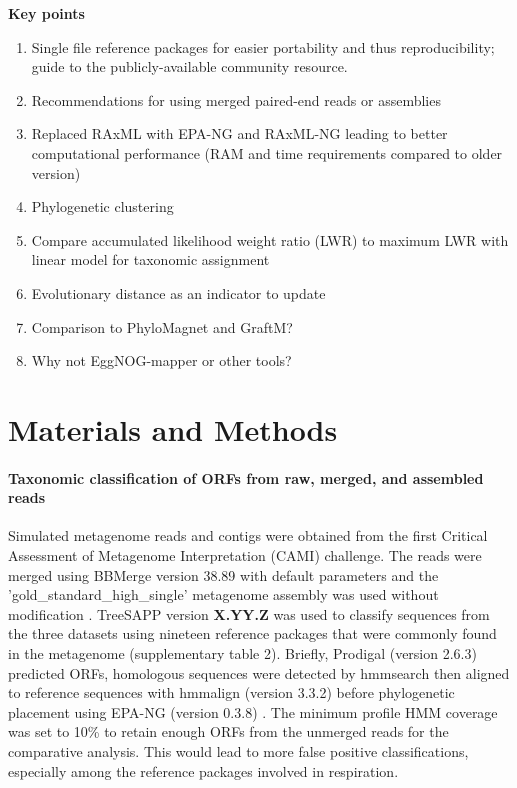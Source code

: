 \documentclass[10pt,letterpaper]{article}
\begin{document}
\textbf{Key points}
\begin{enumerate}
\item Single file reference packages for easier portability and thus reproducibility; guide to the publicly-available community resource.
\item Recommendations for using merged paired-end reads or assemblies
\item Replaced RAxML with EPA-NG and RAxML-NG leading to better computational performance (RAM and time requirements compared to older version)
\item Phylogenetic clustering
\item Compare accumulated likelihood weight ratio (LWR) to maximum LWR with linear model for taxonomic assignment
\item Evolutionary distance as an indicator to update
\item Comparison to PhyloMagnet and GraftM?
\item Why not EggNOG-mapper or other tools?
\end{enumerate}

\section*{Materials and Methods}

\paragraph{}

\paragraph{Taxonomic classification of ORFs from raw, merged, and assembled reads}

Simulated metagenome reads and contigs were obtained from the first Critical Assessment of Metagenome Interpretation (CAMI) challenge\cite{Sczyrba2017}. The reads were merged using BBMerge version 38.89 with default parameters and the 'gold\_standard\_high\_single' metagenome assembly was used without modification \cite{Bushnell2017}. TreeSAPP version \textbf{X.YY.Z} was used to classify sequences from the three datasets using nineteen reference packages that were commonly found in the metagenome (supplementary table 2). Briefly, Prodigal (version 2.6.3) predicted ORFs, homologous sequences were detected by hmmsearch then aligned to reference sequences with hmmalign (version 3.3.2) before phylogenetic placement using EPA-NG (version 0.3.8) \cite{Hyatt2012,Eddy1998a,Barbera2018}. The minimum profile HMM coverage was set to 10\% to retain enough ORFs from the unmerged reads for the comparative analysis. This would lead to more false positive classifications, especially among the reference packages involved in respiration.
\end{document}
